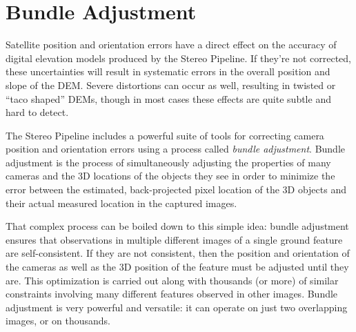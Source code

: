 \chapter{Bundle Adjustment}
\label{ch:bundle_adjustment}


Satellite position and orientation errors have a direct effect on the
accuracy of digital elevation models produced by the Stereo Pipeline.
If they're not corrected, these uncertainties will result in
systematic errors in the overall position and slope of the \ac{DEM}.  Severe
distortions can occur as well, resulting in twisted or ``taco shaped''
\acp{DEM}, though in most cases these effects are quite subtle and hard to
detect.

The Stereo Pipeline includes a powerful suite of tools for correcting
camera position and orientation errors using a process called
\emph{bundle adjustment}.  Bundle adjustment is the process of
simultaneously adjusting the properties of many cameras and the 3D
locations of the objects they see in order to minimize the error
between the estimated, back-projected pixel location of the 3D
objects and their actual measured location in the captured images.

That complex process can be boiled down to this simple idea: bundle
adjustment ensures that observations in multiple different images of a
single ground feature are self-consistent. If they are not consistent,
then the position and orientation of the cameras as well as the 3D
position of the feature must be adjusted until they are.  This
optimization is carried out along with thousands (or more) of similar
constraints involving many different features observed in other
images.  Bundle adjustment is very powerful and versatile: it can
operate on just two overlapping images, or on thousands.

